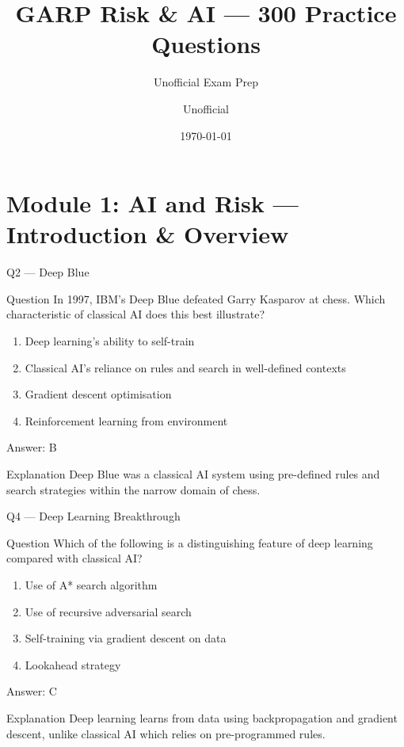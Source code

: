 \documentclass[aspectratio=169,8pt]{beamer}
\title[GARP RAI]{GARP Risk \& AI --- 300 Practice Questions}
\subtitle{Unofficial Exam Prep}
\author{Unofficial}
\date{\today}
\begin{document}
	\begin{frame}\titlepage\end{frame}
	
	\section{Module 1: AI and Risk --- Introduction \& Overview}

	
	\begin{frame}{Q2 --- Deep Blue}
		\begin{block}{Question}
			In 1997, IBM's Deep Blue defeated Garry Kasparov at chess. Which characteristic of classical AI does this best illustrate?
		\end{block}
		\begin{enumerate}
			\item Deep learning's ability to self-train
			\item Classical AI's reliance on rules and search in well-defined contexts
			\item Gradient descent optimisation
			\item Reinforcement learning from environment
		\end{enumerate}
		\begin{exampleblock}{Answer: B}\end{exampleblock}
		\begin{block}{Explanation}
			Deep Blue was a classical AI system using pre-defined rules and search strategies within the narrow domain of chess.
		\end{block}
	\end{frame}
	
	
	\begin{frame}{Q4 --- Deep Learning Breakthrough}
		\begin{block}{Question}
			Which of the following is a distinguishing feature of deep learning compared with classical AI?
		\end{block}
		\begin{enumerate}
			\item Use of A* search algorithm
			\item Use of recursive adversarial search
			\item Self-training via gradient descent on data
			\item Lookahead strategy
		\end{enumerate}
		\begin{exampleblock}{Answer: C}\end{exampleblock}
		\begin{block}{Explanation}
			Deep learning learns from data using backpropagation and gradient descent, unlike classical AI which relies on pre-programmed rules.
		\end{block}
	\end{frame}
	
\end{document}
